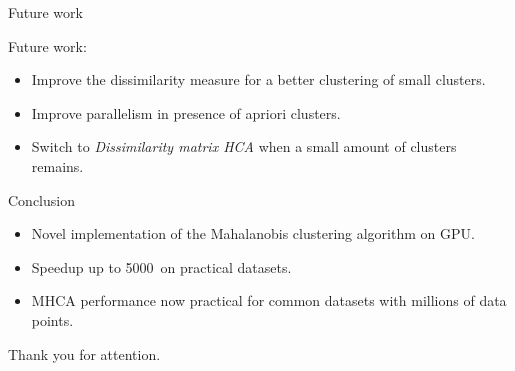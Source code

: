 \documentclass[10pt]{beamer}
\begin{document}
\begin{frame}{Future work}
	
	Future work: 
	\begin{itemize}
		\item Improve the dissimilarity measure for a better clustering
		of small clusters.
		\item Improve parallelism in presence of apriori clusters.
		\item Switch to \emph{Dissimilarity matrix HCA} when a small amount of clusters remains.
	\end{itemize}
	
\end{frame}

\begin{frame}{Conclusion}
	
	\begin{itemize}
		\item Novel implementation of the Mahalanobis clustering algorithm on GPU.
		\item Speedup up to 5000\texttimes\ on practical datasets.
		\item MHCA performance now practical for common datasets with millions of data points.
	\end{itemize}
	
\end{frame}

\begin{frame}[standout]
	
  Thank you for attention.

\end{frame}
\end{document}
